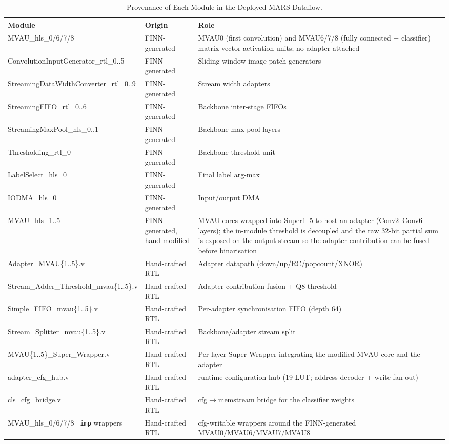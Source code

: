 \documentclass[12pt, a4paper]{report}
\numberwithin{equation}{chapter}
\numberwithin{figure}{chapter}
\numberwithin{table}{chapter}
\numberwithin{algorithm}{chapter}
\begin{document}
\begin{table}[H]
\centering
\caption{Provenance of Each Module in the Deployed MARS Dataflow.}
\label{tab:module_provenance}
\scriptsize
\renewcommand{\arraystretch}{0.95}%
\begin{tabularx}{\textwidth}{@{}ll>{\raggedright\arraybackslash}X@{}}
\toprule
\textbf{Module} & \textbf{Origin} & \textbf{Role} \\
\midrule
MVAU\_hls\_0/6/7/8 & FINN-generated & MVAU0 (first convolution) and MVAU6/7/8 (fully connected + classifier) matrix-vector-activation units; no adapter attached \\
ConvolutionInputGenerator\_rtl\_0..5 & FINN-generated & Sliding-window image patch generators \\
StreamingDataWidthConverter\_rtl\_0..9 & FINN-generated & Stream width adapters \\
StreamingFIFO\_rtl\_0..6 & FINN-generated & Backbone inter-stage FIFOs \\
StreamingMaxPool\_hls\_0..1 & FINN-generated & Backbone max-pool layers \\
Thresholding\_rtl\_0 & FINN-generated & Backbone threshold unit \\
LabelSelect\_hls\_0 & FINN-generated & Final label arg-max \\
IODMA\_hls\_0 & FINN-generated & Input/output DMA \\
\midrule
MVAU\_hls\_1..5 & FINN-generated, hand-modified & MVAU cores wrapped into Super1--5 to host an adapter (Conv2--Conv6 layers); the in-module threshold is decoupled and the raw 32-bit partial sum is exposed on the output stream so the adapter contribution can be fused before binarisation \\
\midrule
Adapter\_MVAU\{1..5\}.v & Hand-crafted RTL & Adapter datapath (down/up/RC/popcount/XNOR) \\
Stream\_Adder\_Threshold\_mvau\{1..5\}.v & Hand-crafted RTL & Adapter contribution fusion + Q8 threshold \\
Simple\_FIFO\_mvau\{1..5\}.v & Hand-crafted RTL & Per-adapter synchronisation FIFO (depth 64) \\
Stream\_Splitter\_mvau\{1..5\}.v & Hand-crafted RTL & Backbone/adapter stream split \\
MVAU\{1..5\}\_Super\_Wrapper.v & Hand-crafted RTL & Per-layer Super Wrapper integrating the modified MVAU core and the adapter \\
adapter\_cfg\_hub.v & Hand-crafted RTL & runtime configuration hub (19 LUT; address decoder + write fan-out) \\
cls\_cfg\_bridge.v & Hand-crafted RTL & cfg$\to$memstream bridge for the classifier weights \\
MVAU\_hls\_0/6/7/8 \texttt{\_imp} wrappers & Hand-crafted RTL & cfg-writable wrappers around the FINN-generated MVAU0/MVAU6/MVAU7/MVAU8 \\
\bottomrule
\end{tabularx}
\end{table}
\end{document}
